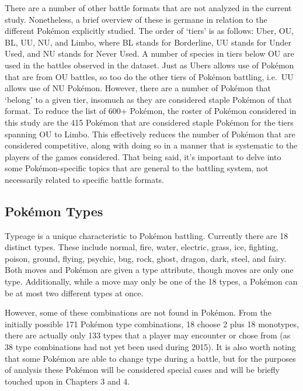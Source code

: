\documentclass[12pt,twoside]{reedthesis}
\begin{document}
  There are a number of other battle formats that are not analyzed in the
  current study. Nonetheless, a brief overview of these is germane in
  relation to the different Pokémon explicitly studied. The order of
  `tiers' is as follows: Uber, OU, BL, UU, NU, and Limbo, where BL stands
  for Borderline, UU stands for Under Used, and NU stands for Never Used.
  A number of species in tiers below OU are used in the battles observed
  in the dataset. Just as Ubers allows use of Pokémon that are from OU
  battles, so too do the other tiers of Pokémon battling, i.e.~UU allows
  use of NU Pokémon. However, there are a number of Pokémon that `belong'
  to a given tier, insomuch as they are considered staple Pokémon of that
  format. To reduce the list of 600+ Pokémon, the roster of Pokémon
  considered in this study are the 415 Pokémon that are considered staple
  Pokémon for the tiers spanning OU to Limbo. This effectively reduces the
  number of Pokémon that are considered competitive, along with doing so
  in a manner that is systematic to the players of the games considered.
  That being said, it's important to delve into some Pokémon-specific
  topics that are general to the battling system, not necessarily related
  to specific battle formats.
  
  \subsection{Pokémon Types}\label{pokemon-types}
  
  Typeage is a unique characteristic to Pokémon battling. Currently there
  are 18 distinct types. These include normal, fire, water, electric,
  grass, ice, fighting, poison, ground, flying, psychic, bug, rock, ghost,
  dragon, dark, steel, and fairy. Both moves and Pokémon are given a type
  attribute, though moves are only one type. Additionally, while a move
  may only be one of the 18 types, a Pokémon can be at most two different
  types at once.
  
  However, some of these combinations are not found in Pokémon. From the
  initially possible 171 Pokémon type combinations, 18 choose 2 plus 18
  monotypes, there are actually only 133 types that a player may encounter
  or chose from (as 38 type combinations had not yet been used during
  2015). It is also worth noting that some Pokémon are able to change type
  during a battle, but for the purposes of analysis these Pokémon will be
  considered special cases and will be briefly touched upon in Chapters 3
  and 4.
  
\end{document}
